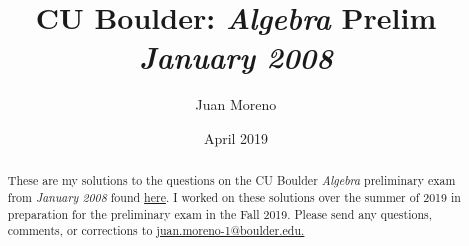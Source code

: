 \documentclass[11pt]{article}
\newcommand{\1}{\textbf{1}}
\begin{document}
\title{\LARGE \textbf{CU Boulder: \textit{Algebra} %
Prelim \\ \textit{January 2008}} %
\vspace{-.75cm}}%
\author{Juan Moreno
} 
\date{\vspace{-0.45cm}April 2019} %

 
\maketitle

\renewcommand{\abstractname}{\vspace{-\baselineskip}}
\begin{abstract}
\noindent These are my solutions to the questions on the CU Boulder \textit{Algebra} preliminary exam from \textit{January 2008} found  \href{http://math.colorado.edu/documents/graduate/prelim/Algebra_Jan_2008.pdf}{here}. I worked on these solutions over the summer of 2019 in preparation for the preliminary exam in the Fall 2019. Please send any questions, comments, or corrections to \href{mailto: juan.moreno-1@boulder.edu}{juan.moreno-1@boulder.edu.} \\
\end{abstract}
\end{document}
